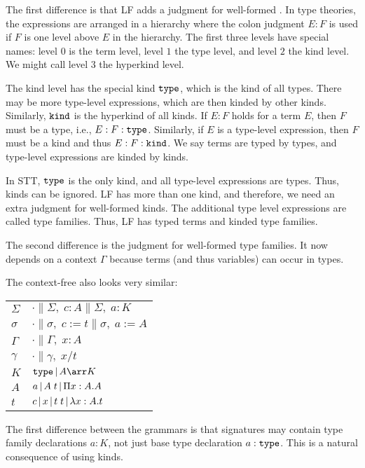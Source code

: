 The first difference is that LF adds a judgment for well-formed . In type theories, the expressions are arranged in a hierarchy where the colon judgment $E:F$ is used if $F$ is one level above $E$ in the hierarchy. The first three levels have special names: level $0$ is the term level, level $1$ the type level, and level $2$ the kind level. We might call level $3$ the hyperkind level.

The kind level has the special kind $\TYPE$, which is the kind of all types. There may be more type-level expressions, which are then kinded by other kinds. Similarly, $\KIND$ is the hyperkind of all kinds.
If $E:F$ holds for a term $E$, then $F$ must be a type, i.e., $E:F:\TYPE$. Similarly, if $E$ is a type-level expression, then $F$ must be a kind and thus $E:F:\KIND$. We say terms are typed by types, and type-level expressions are kinded by kinds.

In STT, $\TYPE$ is the only kind, and all type-level expressions are types. Thus, kinds can be ignored. LF has more than one kind, and therefore, we need an extra judgment for well-formed kinds. The additional type level expressions are called type families. Thus, LF has typed terms and kinded type families.

The second difference is the judgment for well-formed type families. It now depends on a context $\Gamma$ because terms (and thus variables) can occur in types.

The context-free  also looks very similar:
\begin{center}
	\begin{tabular}{l@{\tb::=\tb}l}
		$\Sigma$ & $\cdot \| \Sigma,\;c:A \| \Sigma,\;a:K$ \\
		$\sigma$ & $\cdot \| \sigma,\;c:=t \| \sigma,\;a:=A$ \\
		$\Gamma$ & $\cdot \| \Gamma,\;x:A$ \\
		$\gamma$ & $\cdot \| \gamma,\;x/t$ \\
		$K$      & $\TYPE \| A\arr K$ \\
		$A$    & $a       \| A\;t \| \P{x}{A}A$ \\
		$t$      & $c     \| x \| t\;t \| \lam{x}{A}t$ \\
	\end{tabular}
\end{center}

The first difference between the grammars is that signatures may contain type family declarations $a:K$, not just base type declaration $a:\TYPE$. This is a natural consequence of using kinds.


